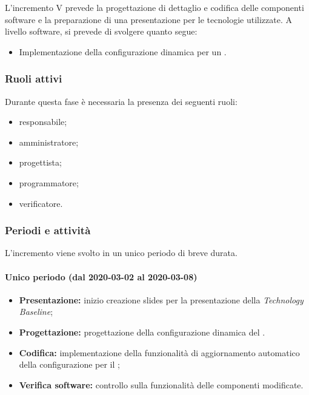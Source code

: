 			L'incremento V prevede la progettazione di dettaglio e codifica delle componenti software e la preparazione di una presentazione per le tecnologie utilizzate. A livello software, si prevede di svolgere quanto segue:
			\begin{itemize}
				\item Implementazione della configurazione dinamica per un .
			\end{itemize}
			
			\subsubsection{Ruoli attivi}
			
				Durante questa fase è necessaria la presenza dei seguenti ruoli:
				\begin{itemize}
					\item responsabile;
					\item amministratore;
					\item progettista;
					\item programmatore;
					\item verificatore.
				\end{itemize}
			
			\subsubsection{Periodi e attività}
			
				L'incremento viene svolto in un unico periodo di breve durata.
				
				\paragraph{Unico periodo (dal 2020-03-02 al 2020-03-08)}
				
					\begin{itemize}
						\item \textbf{Presentazione:} inizio creazione slides per la presentazione della \textit{Technology Baseline};
						\item \textbf{Progettazione:} progettazione della configurazione dinamica del .
						\item \textbf{Codifica:} implementazione della funzionalità di aggiornamento automatico della configurazione per il ;
						\item \textbf{Verifica software:} controllo sulla funzionalità delle componenti modificate.
					\end{itemize} 			


